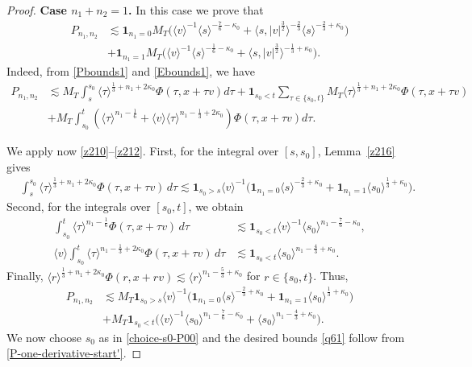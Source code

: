 \documentclass[reqno,11pt]{amsart}
\numberwithin{equation}{section}
\begin{document}
\begin{proof}
	
	
	{\bf{Case $n_1+n_2=1$.}} In this case we prove that
	\begin{align}\nonumber
		P_{n_1,n_2}&\lesssim \mathbf{1}_{n_1=0}M_T\big(\langle v\rangle^{-1}\langle s\rangle^{-\frac{7}{6}-\kappa_0}+\langle s,|v|^{\frac{3}{2}}\rangle^{-\frac{2}{3}} 	\langle s\rangle^{-\frac{2}{3}+\kappa_0}\big)
		\\&+\mathbf{1}_{n_1=1}M_T\big(\langle v\rangle^{-1}\langle s\rangle^{-\frac{1}{6}-\kappa_0}+\langle s,|v|^{\frac{3}{2}}\rangle^{-\frac{1}{3}+\kappa_0}\big).\label{q61}
	\end{align}	
	Indeed, from \eqref{Pbounds1} and \eqref{Ebounds1}, we have
	\begin{align}\nonumber
		P_{n_1,n_2}	&\lesssim M_T\int_s^{s_0} \langle \tau\rangle^{\frac{1}{3}+n_1+2\kappa_0} \Phi(\tau,x+\tau v)d\tau+\mathbf 1_{s_0<t}\sum_{\tau\in\{s_0,t\}}M_T \langle \tau\rangle^{\frac{1}{3}+n_1+2\kappa_0} \Phi(\tau,x+\tau v)\\&
		+M_T\int_{s_0}^{t}(\langle \tau\rangle^{n_1-\frac{1}{6}}+\langle v\rangle\langle \tau\rangle^{n_1-\frac{1}{3}+2\kappa_0})\Phi(\tau,x+\tau v)d\tau.	\label{P-one-derivative-start}
	\end{align}
	
	We apply now \eqref{z210}--\eqref{z212}. First, for the integral over $[s,s_0]$, Lemma~\ref{z216} gives
	\begin{align}
		&\int_s^{s_0}
		\langle \tau\rangle^{\frac13+n_1+2\kappa_0}
		\Phi(\tau,x+\tau v)\,d\tau\lesssim\mathbf 1_{s_0>s}\langle v\rangle^{-1}
		\big(\mathbf 1_{n_1=0}\langle s\rangle^{-\frac23+\kappa_0}+\mathbf 1_{n_1=1}\langle s_0\rangle^{\frac13+\kappa_0}\big)
		\label{q61-I0}.
	\end{align}
	Second, for the integrals over $[s_0,t]$, we obtain
	\begin{equation*}
		\begin{split}
			\int_{s_0}^{t}
			\langle \tau\rangle^{n_1-\frac16}
			\Phi(\tau,x+\tau v)\,d\tau
			&\lesssim\mathbf{1}_{s_0<t}\langle v\rangle^{-1}\langle s_0\rangle^{n_1-\frac76-\kappa_0},\\
			\langle v\rangle
			\int_{s_0}^{t}
			\langle \tau\rangle^{n_1-\frac13+2\kappa_0}
			\Phi(\tau,x+\tau v)\,d\tau
			&\lesssim\mathbf{1}_{s_0<t}\langle s_0\rangle^{n_1-\frac43+\kappa_0}.
		\end{split}
	\end{equation*}
	Finally, $\langle r\rangle^{\frac13+n_1+2\kappa_0}\Phi(r,x+rv)\lesssim\langle r\rangle^{n_1-\frac53+\kappa_0}$ for $r\in\{s_0,t\}$. Thus, 
	\begin{align}\nonumber
		P_{n_1,n_2}	&\lesssim M_T	\mathbf 1_{s_0>s}\langle v\rangle^{-1}\big(\mathbf 1_{n_1=0}
		\langle s\rangle^{-\frac23+\kappa_0}+\mathbf 1_{n_1=1}
		\langle s_0\rangle^{\frac13+\kappa_0}\big)\\&
		+M_T\mathbf{1}_{s_0<t}\big(\langle v\rangle^{-1}
		\langle s_0\rangle^{n_1-\frac76-\kappa_0}+	\langle s_0\rangle^{n_1-\frac43+\kappa_0}\big).	\label{P-one-derivative-start'}
	\end{align}
	We now choose  $s_0$ as in \eqref{choice-s0-P00} and the desired bounds \eqref{q61} follow from \eqref{P-one-derivative-start'}.
	

\end{proof}
\end{document}
